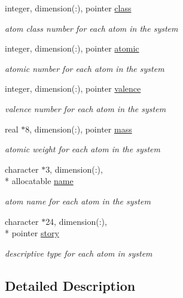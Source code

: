 \begin{DoxyCompactItemize}
integer, dimension(\-:), pointer \hyperlink{classatmtyp_a48303b334c626a3533cdb171193bce65}{class}
\begin{DoxyCompactList}\small\item\em atom class number for each atom in the system \end{DoxyCompactList}\item 
integer, dimension(\-:), pointer \hyperlink{classatmtyp_ab316f0521d8d32f8cb3a66233aa75f16}{atomic}
\begin{DoxyCompactList}\small\item\em atomic number for each atom in the system \end{DoxyCompactList}\item 
integer, dimension(\-:), pointer \hyperlink{classatmtyp_a0f05822b2b1986c78f298a45593bf90e}{valence}
\begin{DoxyCompactList}\small\item\em valence number for each atom in the system \end{DoxyCompactList}\item 
real $\ast$8, dimension(\-:), pointer \hyperlink{classatmtyp_a38f28acf1bb80d2b494b2dd1228cf6e7}{mass}
\begin{DoxyCompactList}\small\item\em atomic weight for each atom in the system \end{DoxyCompactList}\item 
character $\ast$3, dimension(\-:), \\*
allocatable \hyperlink{classatmtyp_a80d3ce7bde3a35105e7ca5ae45114a57}{name}
\begin{DoxyCompactList}\small\item\em atom name for each atom in the system \end{DoxyCompactList}\item 
character $\ast$24, dimension(\-:), \\*
pointer \hyperlink{classatmtyp_a434fbc7be4831519b37b23ddf471109c}{story}
\begin{DoxyCompactList}\small\item\em descriptive type for each atom in system \end{DoxyCompactList}\end{DoxyCompactItemize}


\subsection{Detailed Description}


